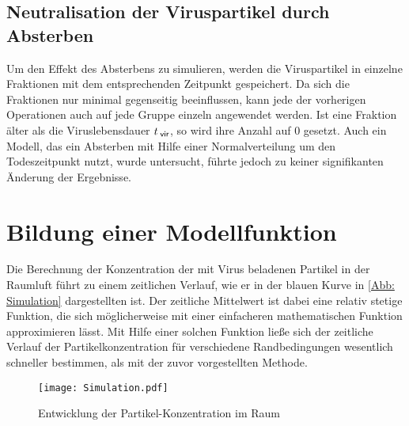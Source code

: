 \documentclass[12pt,a4paper,bibtotocnumbered,liststotocnumbered]{scrreprt}
\begin{document}
\subsection{Neutralisation der Viruspartikel durch Absterben}
Um den Effekt des Absterbens zu simulieren, werden die Viruspartikel in einzelne Fraktionen mit dem entsprechenden Zeitpunkt gespeichert. Da sich die Fraktionen nur minimal gegenseitig beeinflussen, kann jede der vorherigen Operationen auch auf jede Gruppe einzeln angewendet werden. Ist eine Fraktion älter als die Viruslebensdauer $t_{\: \mathsf{vir}}$, so wird ihre Anzahl auf 0 gesetzt. Auch ein Modell, das ein Absterben mit Hilfe einer Normalverteilung um den Todeszeitpunkt nutzt, wurde untersucht, führte jedoch zu keiner signifikanten Änderung der Ergebnisse. 

\section{Bildung einer Modellfunktion}
Die Berechnung der Konzentration der mit Virus beladenen Partikel in der Raumluft führt zu einem zeitlichen Verlauf, wie er in der blauen Kurve in \autoref{Abb: Simulation} dargestellten ist. Der zeitliche Mittelwert ist dabei eine relativ stetige Funktion, die sich möglicherweise mit einer einfacheren mathematischen Funktion approximieren lässt. Mit Hilfe einer solchen Funktion ließe sich der zeitliche Verlauf der Partikelkonzentration für verschiedene Randbedingungen wesentlich schneller bestimmen, als mit der zuvor vorgestellten Methode.
\begin{figure}[H]
\begin{center}
\texttt{[image: Simulation.pdf]}
\caption{Entwicklung der Partikel-Konzentration im Raum}
\label{Abb: Simulation}
\end{center}
\end{figure}
\end{document}
